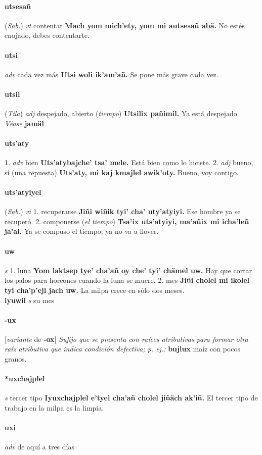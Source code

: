 \documentclass{scrbook}
\newcommand{\entry}[1]{\paragraph{#1}}
\newcommand{\onedefinition}[1]{#1.}
\newcommand{\nontranslationdef}[1]{\textit{#1}}
\newcommand{\partofspeech}[1]{\textit{#1}}
\newcommand{\spanishtranslation}[1]{#1}
\newcommand{\clarification}[1]{(\textit{#1})}
\newcommand{\cholexample}[1]{\textbf{#1}}
\newcommand{\exampletranslation}[1]{#1}
\newcommand{\alsosee}[1]{\\\textit{Véase} \textbf{#1}}
\newcommand{\relevantdialect}[1]{(\textit{#1})}
\newcommand{\secondaryentry}[1]{\\\textbf{#1}}
\newcommand{\secondpartofspeech}[1]{\textit{#1}}
\newcommand{\secondtranslation}[1]{#1}
\newcommand{\conjugationtense}[1]{[\textit{#1}}
\newcommand{\conjugationverb}[1]{de \textbf{#1}]}
\begin{document}
\begin{multicols}{2}
\entry{utsesañ}
\relevantdialect{Sab.}
\partofspeech{vt}
\spanishtranslation{contentar}
\cholexample{Mach yom mich'ety, yom mi autsesañ abä.}
\exampletranslation{No estés enojado, debes contentarte.}

\entry{utsi}
\partofspeech{adv}
\spanishtranslation{cada vez más}
\cholexample{Utsi woli ik'am'añ.}
\exampletranslation{Se pone más grave cada vez.}

\entry{utsil}
\relevantdialect{Tila}
\partofspeech{adj}
\spanishtranslation{despejado, abierto}
\clarification{tiempo}
\cholexample{Utsilix pañimil.}
\exampletranslation{Ya está despejado.}
\alsosee{jamäl}

\entry{uts'aty}
\onedefinition{1}
\partofspeech{adv}
\spanishtranslation{bien}
\cholexample{Uts'atybajche' tsa' mele.}
\exampletranslation{Está bien como lo hiciste.}
\onedefinition{2}
\partofspeech{adj}
\spanishtranslation{bueno, sí (una repuesta)}
\cholexample{Uts'aty, mi kaj kmajlel awik'oty.}
\exampletranslation{Bueno, voy contigo.}

\entry{uts'atyiyel}
\relevantdialect{Sab.}
\partofspeech{vi}
\onedefinition{1}
\spanishtranslation{recuperarse}
\cholexample{Jiñi wiñik tyi' cha' uty'atyiyi.}
\exampletranslation{Ese hombre ya se recuperó.}
\onedefinition{2}
\spanishtranslation{componerse}
\clarification{el tiempo}
\cholexample{Tsa'ix uts'atyiyi, ma'añix mi icha'leñ ja'al.}
\exampletranslation{Ya se compuso el tiempo; ya no va a llover.}

\entry{uw}
\partofspeech{s}
\onedefinition{1}
\spanishtranslation{luna}
\cholexample{Yom laktsep tye' cha'añ oy che' tyi' chämel uw.}
\exampletranslation{Hay que cortar los palos para horcones cuando la luna se muere.}
\onedefinition{2}
\spanishtranslation{mes}
\cholexample{Jiñi cholel mi ikolel tyi cha'p'ejl jach uw.}
\exampletranslation{La milpa crece en sólo dos meses.}
\secondaryentry{iyuwil}
\secondpartofspeech{s}
\secondtranslation{su mes}

\entry{-ux}
\conjugationtense{variante}
\conjugationverb{-ox}
\nontranslationdef{Sufijo que se presenta con raíces atributivas para formar otra raíz atributiva que indica condición defectiva; p. ej.:}
\cholexample{bujlux}
\exampletranslation{maíz con pocos granos.}

\entry{*uxchajplel}
\partofspeech{s}
\spanishtranslation{tercer tipo}
\cholexample{Iyuxchajplel e'tyel cha'añ cholel jiñäch ak'iñ.}
\exampletranslation{El tercer tipo de trabajo en la milpa es la limpia.}

\entry{uxi}
\partofspeech{adv}
\spanishtranslation{de aquí a tres días}


\end{multicols}
\end{document}
